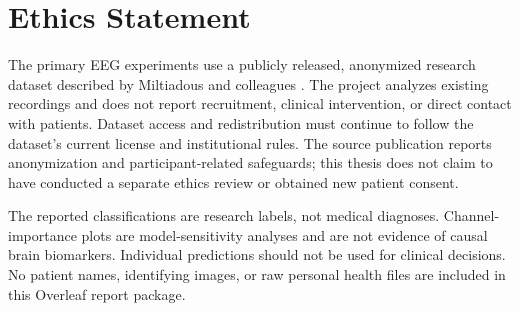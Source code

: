 \chapter*{Ethics Statement}
The primary EEG experiments use a publicly released, anonymized research dataset described by Miltiadous and colleagues \cite{miltiadous2023dataset,miltiadous2026dataset}. The project analyzes existing recordings and does not report recruitment, clinical intervention, or direct contact with patients. Dataset access and redistribution must continue to follow the dataset's current license and institutional rules. The source publication reports anonymization and participant-related safeguards; this thesis does not claim to have conducted a separate ethics review or obtained new patient consent.\par
\vspace{0.3cm}
\noindent The reported classifications are research labels, not medical diagnoses. Channel-importance plots are model-sensitivity analyses and are not evidence of causal brain biomarkers. Individual predictions should not be used for clinical decisions. No patient names, identifying images, or raw personal health files are included in this Overleaf report package.\par
